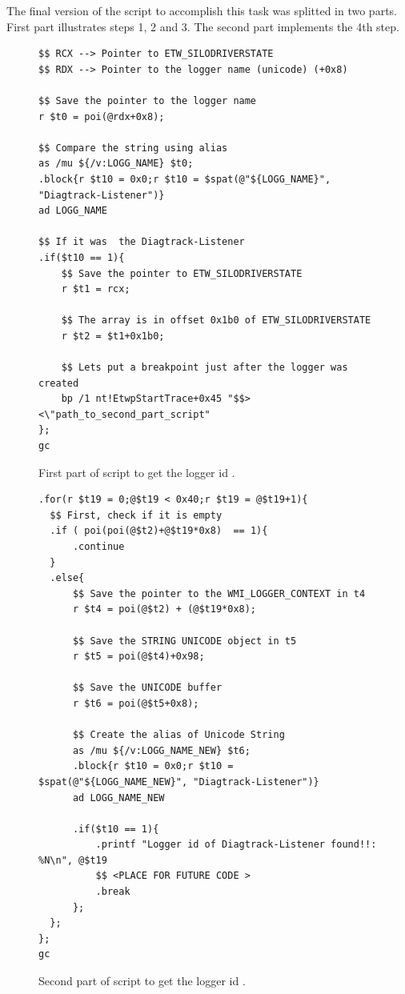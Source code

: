 The final version of the script to accomplish this task was splitted in two parts. First part illustrates steps 1, 2 and 3. The second part implements the 4th step.


\begin{figure}[H]
\begin{lstlisting}
$$ RCX --> Pointer to ETW_SILODRIVERSTATE
$$ RDX --> Pointer to the logger name (unicode) (+0x8)

$$ Save the pointer to the logger name
r $t0 = poi(@rdx+0x8);

$$ Compare the string using alias
as /mu ${/v:LOGG_NAME} $t0;
.block{r $t10 = 0x0;r $t10 = $spat(@"${LOGG_NAME}", "Diagtrack-Listener")} 
ad LOGG_NAME

$$ If it was  the Diagtrack-Listener
.if($t10 == 1){
    $$ Save the pointer to ETW_SILODRIVERSTATE
    r $t1 = rcx;
    
    $$ The array is in offset 0x1b0 of ETW_SILODRIVERSTATE
    r $t2 = $t1+0x1b0;

    $$ Lets put a breakpoint just after the logger was created
    bp /1 nt!EtwpStartTrace+0x45 "$$><\"path_to_second_part_script"
};
gc
\end{lstlisting}
\caption[]{First part of script to get the logger id . }
\label{fig:loggerid_first_part}
\end{figure}



\begin{figure}[H]
\begin{lstlisting}
.for(r $t19 = 0;@$t19 < 0x40;r $t19 = @$t19+1){
  $$ First, check if it is empty
  .if ( poi(poi(@$t2)+@$t19*0x8)  == 1){
      .continue
  }
  .else{
      $$ Save the pointer to the WMI_LOGGER_CONTEXT in t4
      r $t4 = poi(@$t2) + (@$t19*0x8);

      $$ Save the STRING UNICODE object in t5
      r $t5 = poi(@$t4)+0x98;

      $$ Save the UNICODE buffer
      r $t6 = poi(@$t5+0x8);
      
      $$ Create the alias of Unicode String
      as /mu ${/v:LOGG_NAME_NEW} $t6;
      .block{r $t10 = 0x0;r $t10 = $spat(@"${LOGG_NAME_NEW}", "Diagtrack-Listener")} 
      ad LOGG_NAME_NEW

      .if($t10 == 1){
          .printf "Logger id of Diagtrack-Listener found!!: %N\n", @$t19
          $$ <PLACE FOR FUTURE CODE >
          .break
      };
  };
};
gc
\end{lstlisting}
\caption[]{Second part of script to get the logger id . }
\label{fig:loggerid_second_part}
\end{figure}











